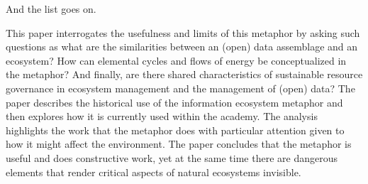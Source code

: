 And the list goes on. 

This paper interrogates the usefulness and limits of this metaphor by asking such questions as what are the similarities between an (open) data assemblage and an ecosystem? How can elemental cycles and flows of energy be conceptualized in the metaphor? And finally, are there shared characteristics of sustainable resource governance in ecosystem management and the management of (open) data?  The paper describes the historical use of the information ecosystem metaphor and then explores how it is currently used within the academy. The analysis highlights the work that the metaphor does with particular attention given to how it might affect the environment. The paper concludes that the metaphor is useful and does constructive work, yet at the same time there are dangerous elements that render critical aspects of natural ecosystems invisible.
